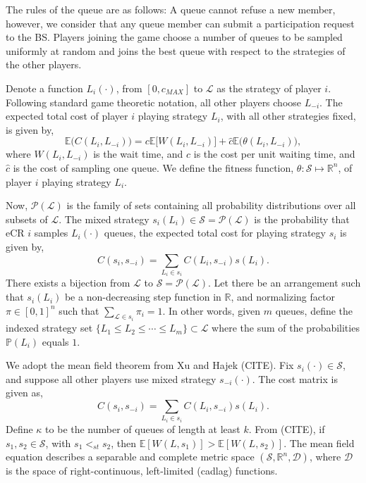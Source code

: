 \documentclass[10pt]{article}
\newcommand{\mcL}{\mathcal{L}}
\newcommand{\mcP}{\mathcal{P}}
\newcommand{\mcS}{\mathcal{S}}
\newcommand{\mcD}{\mathcal{D}}
\theoremstyle{definition}
\begin{document}
The rules of the queue are as follows:
A queue cannot refuse a new member, however, we
consider that any queue member can submit a participation request to the BS.
Players joining the game choose a number of queues to be sampled uniformly at random and joins the best queue with respect
to the strategies of the other players. 

Denote a function $L_i(\cdot)$, from
$[0, c_{MAX}]$ to $\mcL$ as the strategy of player $i$. Following
standard game theoretic notation, all other players choose $L_{-i}$.
The expected total cost of player $i$ playing 
strategy $L_i$, with all other strategies fixed, is given by, 
$$
    \mathbb{E}\big(C(L_i,L_{-i})\big) = c\mathbb{E}\lbrack W(L_i,L_{-i})\rbrack + \hat c
    \mathbb{E}\big(\theta(L_i,L_{-i})\big),
$$
where $W(L_i,L_{-i})$ is the wait time, and
$c$ is the cost per unit waiting time, and $\hat c$ is the cost of sampling one queue. 
We define the fitness function, $\theta:\mcS \mapsto \mathbb{R}^n$, of player $i$ playing strategy $L_i$. 

Now, $\mcP(\mcL)$ is the family of sets containing all probability distributions over
all subsets of $\mcL$. The mixed
strategy $s_i(L_i) \in \mcS=\mcP(\mcL)$ is the probability that
eCR $i$ samples $L_i(\cdot)$ queues, 
the expected total cost for playing strategy $s_i$ is given by,
$$
    C(s_i, s_{-i}) = \displaystyle \sum_{L_i \in s_i} C(L_i,s_{-i})s(L_i).
$$
There exists a bijection from $\mcL$ to $\mcS=\mcP(\mcL)$. Let there be an
arrangement such that $s_i(L_i)$ be a non-decreasing step function in
$\mathbb{R}$, and normalizing factor $\pi \in [0,1]^n$ such that $\sum_{\mcL \in
s_i} \pi_i = 1$. In other words, given $m$ queues, 
define the indexed strategy set $\lbrace L_1 \le L_2 \le\cdots \le L_m\rbrace
\subset \mcL$ where the sum of the probabilities $\mathbb{P}(L_i)$ equals $1$.

We adopt the mean field theorem from Xu and Hajek (CITE).
Fix $s_i(\cdot) \in \mcS$, and suppose all other players use mixed strategy
$s_{-i}(\cdot)$. 
The cost matrix is given as,
$$
    C(s_i, s_{-i}) = \displaystyle \sum_{L_i \in s_i} C(L_i,s_{-i})s(L_i).
$$
Define $\kappa$ to be the number of queues of length at least $k$.
From (CITE), if $s_1,s_2\in\mcS$, with $s_1<_{st} s_2$, then
$\mathbb{E}[W(L,s_1)] > \mathbb{E}[W(L,s_2)]$.
The mean field equation describes a separable and complete metric space
$(\mcS, \mathbb{R}^n, \mcD)$, where $\mcD$ is the space of right-continuous,
left-limited (cadlag) functions.
\end{document}
